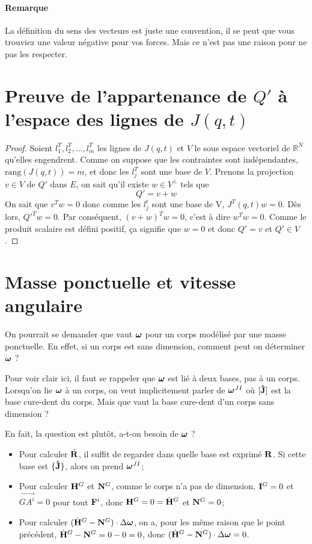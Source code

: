 \paragraph{Remarque}
La définition du sens des vecteurs est juste une convention, il se peut que vous trouviez une valeur négative pour vos forces.
Mais ce n'est pas une raison pour ne pas les respecter.

\annexe
\section{Preuve de l'appartenance de $Q'$ à l'espace des lignes de $J(q, t)$}
\label{ann:orthogonal}
\begin{proof}
  Soient $l_1^T, l_2^T, \ldots, l_m^T$ les lignes de $J(q, t)$ et $V$ le sous espace vectoriel de $\mathbb{R}^N$ qu'elles engendrent.
  Comme on suppose que les contraintes sont indépendantes, $\mathrm{rang}(J(q, t)) = m$, et donc les $l_j^T$ sont une base de $V$.
  Prenons la projection $v \in V$ de $Q'$ dans $E$, on sait qu'il existe $w \in V^\perp$ tels que
  \[ Q' = v + w \]
  On sait que $v^Tw = 0$ donc comme les $l_j^t$ sont une base de V, $J^T(q, t)w = 0$.
  Dès lors, $Q'^T w = 0$.
  Par conséquent, $(v + w)^T w = 0$, c'est à dire $w^T w = 0$.
  Comme le produit scalaire est défini positif, ça signifie que $w = 0$ et donc $Q' = v$ et $Q' \in V$.
\end{proof}

\section{Masse ponctuelle et vitesse angulaire}
On pourrait se demander que vaut ${\bm \omega}$ pour un corps modélisé par une masse ponctuelle.
En effet, si un corps est sans dimension, comment peut on déterminer ${\bm \omega}$ ?

Pour voir clair ici, il faut se rappeler que ${\bm \omega}$ est lié à deux bases, pas à un corps.
Lorsqu'on lie ${\bm \omega}$ à un corps, on veut implicitement parler de ${\bm \omega}^{JI}$ où $[{\bf\hat{J}}]$ est la base cure-dent du corps.
Mais que vaut la base cure-dent d'un corps sans dimension ?

En fait, la question est plutôt, a-t-on besoin de ${\bm \omega}$ ?
\begin{itemize}
  \item Pour calculer $\dot{\bf R}$,
    il suffit de regarder dans quelle base est exprimé ${\bf R}$.
    Si cette base est $\{{\bf\hat{J}}\}$, alors on prend ${\bm \omega}^{JI}$;
  \item Pour calculer ${\bf H}^G$ et ${\bf N}^G$, comme le corps n'a pas de dimension, ${\bf I}^G = 0$ et $\vec{GA^i} = 0$ pour tout ${\bf F}^i$, donc
    ${\bf H}^G = 0 = \dot{{\bf H}}^G$ et ${\bf N}^G = 0$;
  \item Pour calculer $(\dot{{\bf H}}^G - {\bf N}^G) \cdot \Delta {\bm \omega}$, on a, pour les même raison que le point précédent,
    $\dot{{\bf H}}^G - {\bf N}^G = 0 - 0 = 0$, donc $(\dot{{\bf H}}^G - {\bf N}^G) \cdot \Delta {\bm \omega} = 0$.
\end{itemize}


